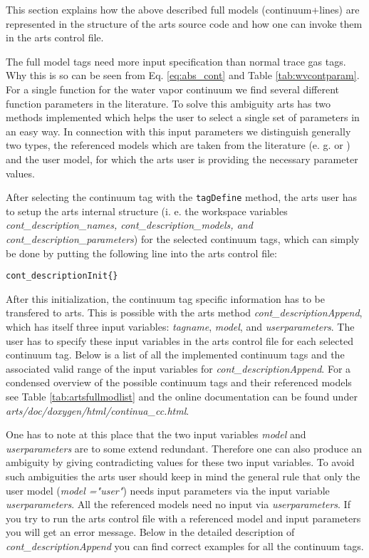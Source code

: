 {
\label{levelc:ArtsImplementationCompleteModels}

This section explains how the above described full models (continuum+lines) 
are represented in the structure of the arts source code and how 
one can invoke them in the arts control file.

The full model tags need more input specification than normal trace gas
tags. Why this is so can be seen from Eq. \ref{eq:abs_cont} and 
Table \ref{tab:wvcontparam}. For a single function for the water vapor 
continuum we find several different function parameters in the literature. 
To solve this ambiguity arts has two methods implemented which helps 
the user to select a single set of parameters in an easy way. 
In connection with this input parameters we distinguish generally two 
types, the referenced models which are taken from the literature 
(e. g. \cite{liebeetal:93} or \cite{pwr:93}) and the user model, 
for which the arts user is providing the necessary parameter values.

After selecting the continuum tag with the {\tt tagDefine} method, 
the arts user has to setup the arts internal structure (i. e. the workspace 
variables {\it cont\_description\_names, cont\_description\_models, 
and cont\_description\_parameters}) for the selected continuum tags, 
which can simply be done by putting the following line into the arts control file:
\begin{verbatim}
cont_descriptionInit{}
\end{verbatim}

After this initialization, the continuum tag specific
information has to be transfered to arts. This is possible with the 
arts method {\it cont\_descriptionAppend}, which has itself 
three input variables: {\it tagname}, {\it model}, and 
{\it userparameters}. The user has to specify these input 
variables in the arts control file for each selected continuum tag. 
Below is a list of all the implemented continuum tags and the associated
valid range of the input variables for {\it cont\_descriptionAppend}. 
For a condensed overview of the possible continuum tags and their 
referenced models see Table \ref{tab:artsfullmodlist} and the 
online documentation can be found under 
{\it arts/doc/doxygen/html/continua\_cc.html}.

One has to note at this place that the two input variables {\it model} and
{\it userparameters} are to some extend redundant. Therefore one can also 
produce an ambiguity by giving contradicting values for these two input variables.
To avoid such ambiguities the arts user should keep in mind the general 
rule that only the user model ({\it model ="user"}) needs input parameters 
via the input variable {\it userparameters}. All the referenced models 
need no input via {\it userparameters}. If you try to run the arts control 
file with a referenced model and input parameters you will get an error message.
Below in the detailed description of {\it cont\_descriptionAppend} you 
can find correct examples for all the continuum tags.

}
